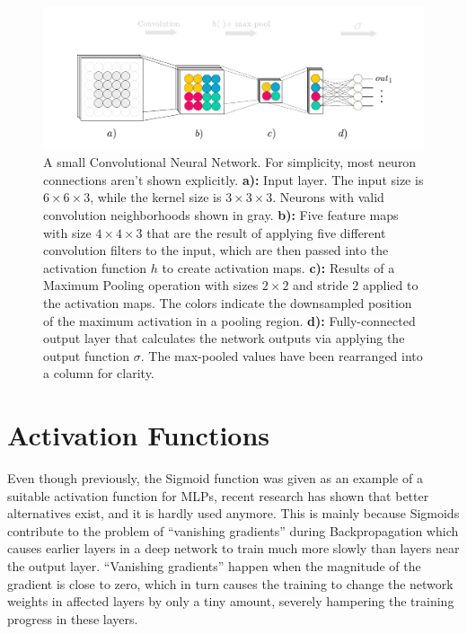 \begin {figure}[!ht]
	\begin{center}
		\includegraphics[scale=0.75]{img/fig_convnet}
	\end{center}
	\caption{A small Convolutional Neural Network. For simplicity, most neuron connections aren't shown explicitly. \textbf{a):} Input layer. The input size is $6 \times 6 \times 3$, while the kernel size is $3 \times 3 \times 3$. Neurons with valid convolution neighborhoods shown in gray. \textbf{b):} Five feature maps with size $4 \times 4 \times 3$ that are the result of applying five different convolution filters to the input, which are then passed into the activation function $h$ to create activation maps. \textbf{c):} Results of a Maximum Pooling operation with sizes $2 \times 2$ and stride $2$ applied to the activation maps. The colors indicate the downsampled position of the maximum activation in a pooling region. \textbf{d):} Fully-connected output layer that calculates the network outputs via applying the output function $\sigma$. The max-pooled values have been rearranged into a column for clarity.}
	\label{fig:convnet}
\end {figure}


	\section {Activation Functions}
Even though previously, the Sigmoid function was given as an example of a suitable activation function for MLPs, recent research \cite{glorot, rectifiers} has shown that better alternatives exist, and it is hardly used anymore. This is mainly because Sigmoids contribute to the problem of ``vanishing gradients'' during Backpropagation which causes earlier layers in a deep network to train much more slowly than layers near the output layer. ``Vanishing gradients'' happen when the magnitude of the gradient is close to zero, which in turn causes the training to change the network weights in affected layers by only a tiny amount, severely hampering the training progress in these layers.

